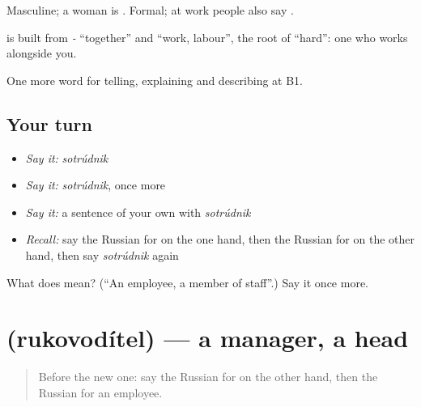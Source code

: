 Masculine; a woman is \emph{}. Formal; at work people also say \emph{}.

\begin{cousinweb}
\textbf{} is built from \emph{-} \textquotedblleft{}together\textquotedblright{} and \emph{} \textquotedblleft{}work, labour\textquotedblright{}, the root of \emph{} \textquotedblleft{}hard\textquotedblright{}: one who works alongside you.
\end{cousinweb}

\begin{grammarlens}[title={What you've built}]
One more word for telling, explaining and describing at B1.
\end{grammarlens}

\subsection*{Your turn}
\begin{itemize}
\raggedright
  \item \emph{Say it:} \emph{sotrúdnik}
  \item \emph{Say it:} \emph{sotrúdnik}, once more
  \item \emph{Say it:} a sentence of your own with \emph{sotrúdnik}
  \item \emph{Recall:} say the Russian for on the one hand, then the Russian for on the other hand, then say \emph{sotrúdnik} again
\end{itemize}

\begin{tcolorbox}[breakable,colback=teal!4,colframe=teal!35!black,title={Before you move on}]
What does  mean? (\textquotedblleft{}An employee, a member of staff\textquotedblright{}.) Say it once more.
\end{tcolorbox}
\section[\texorpdfstring{\ru{руководитель} (rukovodítel)}{руководитель (rukovodítel)}]{ (rukovodítel) — a manager, a head}

\label{lesson:RU-C357-rukovoditel}



\begin{quote}
Before the new one: say the Russian for on the other hand, then the Russian for an employee.
\end{quote}

